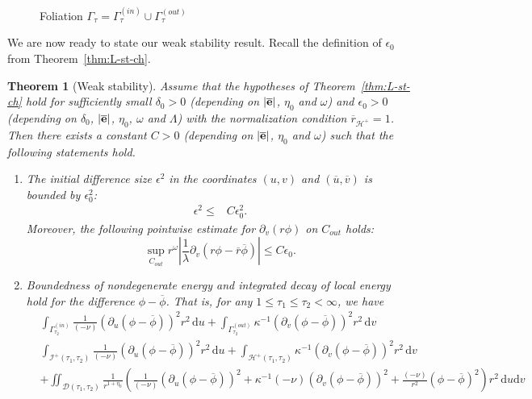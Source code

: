\documentclass[10pt, reqno]{amsart}
\newtheorem{theorem}{Theorem}[section]
\theoremstyle{definition}
\theoremstyle{remark}
\theoremstyle{conjecture}
\numberwithin{equation}{section}
\newcommand{\abs}[1]{\vert#1\vert}
\newcommand{\ud}{\mathrm{d}}
\newcommand{\rd}{\partial}
\newcommand{\0}{\emptyset}
\newcommand{\Gmm}{\Gamma}
\newcommand{\dlt}{\delta}
\newcommand{\eps}{\epsilon}
\newcommand{\kpp}{\kappa}
\newcommand{\lmb}{\lambda}
\newcommand{\Lmb}{\Lambda}
\newcommand{\omg}{\omega}
\newcommand{\bfe}{{\bf e}}
\newcommand{\calD}{\mathcal D}
\newcommand{\calH}{\mathcal H}
\newcommand{\calI}{\mathcal I}
\newcommand{\dur}{\nu}
\newcommand{\dvr}{\lmb}
\newcommand{\EH}{\calH^{+}}
\newcommand{\e}{\bfe}							%
\newcommand{\NI}{\calI^{+}}						%
\newcommand{\ubg}{\overline{u}}					%
\newcommand{\vbg}{\overline{v}}					%
\newcommand{\phibg}{\overline{\phi}}				%
\newcommand{\rbg}{\overline{r}}					%
\newcommand{\ebg}{\overline{\e}}					%
\newcommand{\Abs}[1]{\left\vert #1 \right\vert}
\begin{document}
\begin{figure}[h]
\begin{center}
\def\svgwidth{250px}
 
\caption{Foliation $\Gmm_{\tau} = \Gmm_{\tau}^{(in)} \cup \Gmm_{\tau}^{(out)}$} \label{fig:energy}
\end{center}
\end{figure}

We are now ready to state our weak stability result. Recall the definition of $\eps_{0}$ from Theorem~\ref{thm:L-st-ch}. 
\begin{theorem} [Weak stability] \label{thm:weak-st}
Assume that the hypotheses of Theorem~\ref{thm:L-st-ch} hold for sufficiently small $\dlt_{0} > 0$ (depending on $\abs{\ebg}$, $\eta_0$ and $\omg$) and $\eps_{0} > 0$ (depending on $\dlt_0$, $\abs{\ebg}$, $\eta_0$, $\omg$ and $\Lmb$) with the normalization condition $\rbg_{\EH}=1$. Then there exists a constant $C > 0$ (depending on $\abs{\ebg}$, $\eta_0$ and $\omg$) such that the following statements hold.
\begin{enumerate}
\item The initial difference size $\eps^{2}$ in the coordinates $(u, v)$ and $(\ubg, \vbg)$ is bounded by $\eps_{0}^{2}$:
\begin{align} \label{eq:gauge:eps} 
	\eps^{2} \leq & C \eps_{0}^{2}. 
\end{align}
Moreover, the following pointwise estimate for $\rd_{v}(r \phi)$ on $C_{out}$ holds:
\begin{equation} \label{eq:gauge:dvrphi}	
	\sup_{C_{out}} r^{\omg} \Abs{\frac{1}{\dvr} \rd_{v}(r \phi - \rbg \phibg)}
	\leq C \eps_{0}.		
\end{equation}
\item Boundedness of nondegenerate energy and integrated decay of local energy hold for the difference $\phi - \phibg$. That is, for any $1 \leq \tau_{1} \leq \tau_{2} < \infty$, we have
\begin{equation} \label{eq:energy}
\begin{aligned}
	& \int_{\Gmm^{(in)}_{\tau_{2}}} \frac{1}{(-\dur)} (\rd_{u} (\phi - \phibg))^{2} r^{2} \, \ud u
	+ \int_{\Gmm^{(out)}_{\tau_{2}}} \kpp^{-1} (\rd_{v} (\phi - \phibg))^{2} r^{2} \, \ud v  \\
	& \int_{\NI(\tau_{1}, \tau_{2})} \frac{1}{(-\dur)} (\rd_{u} (\phi - \phibg))^{2} r^{2} \, \ud u
	+ \int_{\EH(\tau_{1}, \tau_{2})} \kpp^{-1} (\rd_{v} (\phi - \phibg))^{2} r^{2} \, \ud v  \\
	& + \iint_{\calD(\tau_{1}, \tau_{2})} \frac{1}{r^{1+\eta_{0}}} \left( \frac{1}{(-\dur)} (\rd_{u} (\phi - \phibg))^{2} + \kpp^{-1} (-\dur) (\rd_{v} (\phi - \phibg))^{2} + \frac{(-\dur)}{r^{2}} (\phi - \phibg)^{2}\right) r^{2} \, \ud u \ud v\\

\end{aligned}
\end{equation}
\end{enumerate}
\end{theorem}
\end{document}
